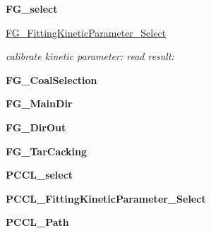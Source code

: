 \begin{DoxyCompactItemize}
\item 
\hypertarget{classPKP_1_1MainProcess_a4cccd00a40918655ca595a0bbe2a3e08}{{\bfseries \-F\-G\-\_\-select}}\label{classPKP_1_1MainProcess_a4cccd00a40918655ca595a0bbe2a3e08}

\item 
\hypertarget{classPKP_1_1MainProcess_a72e29f2d5a8b52f70db64da35d5e992f}{\hyperlink{classPKP_1_1MainProcess_a72e29f2d5a8b52f70db64da35d5e992f}{\-F\-G\-\_\-\-Fitting\-Kinetic\-Parameter\-\_\-\-Select}}\label{classPKP_1_1MainProcess_a72e29f2d5a8b52f70db64da35d5e992f}

\begin{DoxyCompactList}\small\item\em calibrate kinetic parameter\-: read result\-: \end{DoxyCompactList}\item 
\hypertarget{classPKP_1_1MainProcess_a5ab37246c3ef3d6eb4d9ca69a9aec4ee}{{\bfseries \-F\-G\-\_\-\-Coal\-Selection}}\label{classPKP_1_1MainProcess_a5ab37246c3ef3d6eb4d9ca69a9aec4ee}

\item 
\hypertarget{classPKP_1_1MainProcess_a72ba1f5b9b0c9efd3bf16e6b37fa81c5}{{\bfseries \-F\-G\-\_\-\-Main\-Dir}}\label{classPKP_1_1MainProcess_a72ba1f5b9b0c9efd3bf16e6b37fa81c5}

\item 
\hypertarget{classPKP_1_1MainProcess_a72458107d77a3305302698f68f225cd0}{{\bfseries \-F\-G\-\_\-\-Dir\-Out}}\label{classPKP_1_1MainProcess_a72458107d77a3305302698f68f225cd0}

\item 
\hypertarget{classPKP_1_1MainProcess_a190b21872905d95879a451133770541f}{{\bfseries \-F\-G\-\_\-\-Tar\-Cacking}}\label{classPKP_1_1MainProcess_a190b21872905d95879a451133770541f}

\item 
\hypertarget{classPKP_1_1MainProcess_a424e38cb0bc420e67dae9ee229fe1b9e}{{\bfseries \-P\-C\-C\-L\-\_\-select}}\label{classPKP_1_1MainProcess_a424e38cb0bc420e67dae9ee229fe1b9e}

\item 
\hypertarget{classPKP_1_1MainProcess_a66517edd7f0f9952237ee81d721f9991}{{\bfseries \-P\-C\-C\-L\-\_\-\-Fitting\-Kinetic\-Parameter\-\_\-\-Select}}\label{classPKP_1_1MainProcess_a66517edd7f0f9952237ee81d721f9991}

\item 
\hypertarget{classPKP_1_1MainProcess_a8b017a0c5abb326201d74d4eccc228bd}{{\bfseries \-P\-C\-C\-L\-\_\-\-Path}}\label{classPKP_1_1MainProcess_a8b017a0c5abb326201d74d4eccc228bd}


\end{DoxyCompactItemize}
